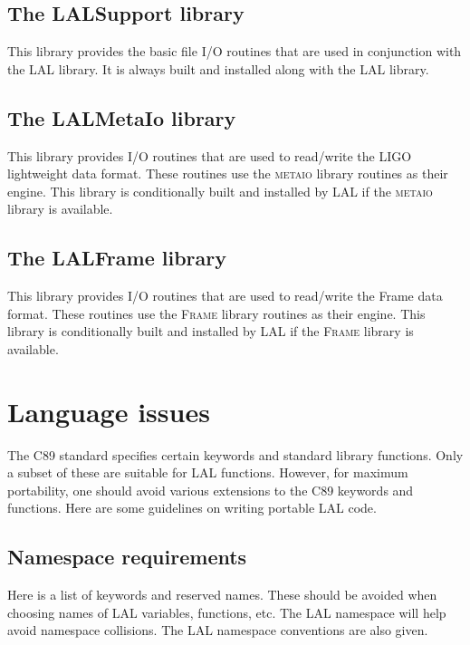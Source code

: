 \documentclass[10pt]{ligodcc}
\renewcommand{\texttt}[1]{{\ttfamily\color{blue}#1}}
\begin{document}
\subsection{The \texttt{LALSupport} library}

This library provides the basic file I/O routines that are used in conjunction
with the LAL library.  It is always built and installed along with the LAL
library.

\subsection{The \texttt{LALMetaIo} library}

This library provides I/O routines that are used to read/write the LIGO
lightweight data format.  These routines use the \textsc{metaio} library
routines as their engine.  This library is conditionally built and installed
by LAL if the \textsc{metaio} library is available.

\subsection{The \texttt{LALFrame} library}

This library provides I/O routines that are used to read/write the Frame
data format.  These routines use the \textsc{Frame} library
routines as their engine.  This library is conditionally built and installed
by LAL if the \textsc{Frame} library is available.

\appendix

\section{Language issues}
\label{a:language}

The C89 standard specifies certain keywords and standard library functions.
Only a subset of these are suitable for LAL functions.  However, for maximum
portability, one should avoid various extensions to the C89 keywords and
functions.  Here are some guidelines on writing portable LAL code.

\subsection{Namespace requirements}

Here is a list of keywords and reserved names.  These should be avoided
when choosing names of LAL variables, functions, etc.  The LAL namespace
will help avoid namespace collisions.  The LAL namespace conventions are
also given.
\end{document}
